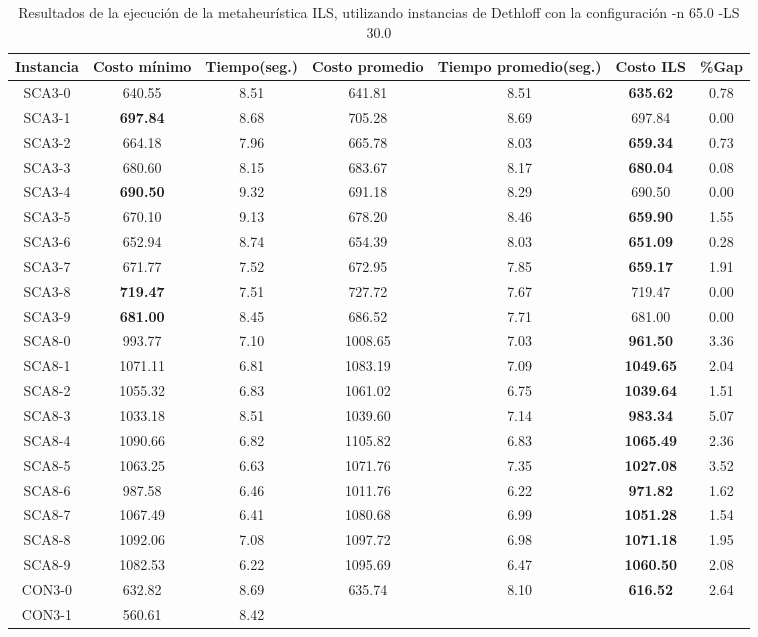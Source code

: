 \begin{table}[ht]
\caption{Resultados de la ejecución de la metaheurística ILS, utilizando instancias de Dethloff con la configuración -n 65.0 -LS 30.0}
\centering
\small
\begin{tabular}{c c c c c c c}
\hline\hline
Instancia & Costo mínimo & Tiempo(seg.) & Costo promedio & Tiempo promedio(seg.) & Costo ILS & \%Gap \\ [0.5ex]
\hline
SCA3-0 & 640.55 & 8.51 & 
641.81 & 8.51 & \bf{635.62} & 
0.78\\SCA3-1 & \bf{697.84} & 8.68 & 
705.28 & 8.69 & 697.84 & 0.00\\
SCA3-2 & 664.18 & 7.96 & 
665.78 & 8.03 & \bf{659.34} & 
0.73\\SCA3-3 & 680.60 & 8.15 & 
683.67 & 8.17 & \bf{680.04} & 
0.08\\SCA3-4 & \bf{690.50} & 9.32 & 
691.18 & 8.29 & 690.50 & 0.00\\
SCA3-5 & 670.10 & 9.13 & 
678.20 & 8.46 & \bf{659.90} & 
1.55\\SCA3-6 & 652.94 & 8.74 & 
654.39 & 8.03 & \bf{651.09} & 
0.28\\SCA3-7 & 671.77 & 7.52 & 
672.95 & 7.85 & \bf{659.17} & 
1.91\\SCA3-8 & \bf{719.47} & 7.51 & 
727.72 & 7.67 & 719.47 & 0.00\\
SCA3-9 & \bf{681.00} & 8.45 & 
686.52 & 7.71 & 681.00 & 0.00\\
SCA8-0 & 993.77 & 7.10 & 
1008.65 & 7.03 & \bf{961.50} & 
3.36\\SCA8-1 & 1071.11 & 6.81 & 
1083.19 & 7.09 & \bf{1049.65} & 
2.04\\SCA8-2 & 1055.32 & 6.83 & 
1061.02 & 6.75 & \bf{1039.64} & 
1.51\\SCA8-3 & 1033.18 & 8.51 & 
1039.60 & 7.14 & \bf{983.34} & 
5.07\\SCA8-4 & 1090.66 & 6.82 & 
1105.82 & 6.83 & \bf{1065.49} & 
2.36\\SCA8-5 & 1063.25 & 6.63 & 
1071.76 & 7.35 & \bf{1027.08} & 
3.52\\SCA8-6 & 987.58 & 6.46 & 
1011.76 & 6.22 & \bf{971.82} & 
1.62\\SCA8-7 & 1067.49 & 6.41 & 
1080.68 & 6.99 & \bf{1051.28} & 
1.54\\SCA8-8 & 1092.06 & 7.08 & 
1097.72 & 6.98 & \bf{1071.18} & 
1.95\\SCA8-9 & 1082.53 & 6.22 & 
1095.69 & 6.47 & \bf{1060.50} & 
2.08\\CON3-0 & 632.82 & 8.69 & 
635.74 & 8.10 & \bf{616.52} & 
2.64\\CON3-1 & 560.61 & 8.42 & 

\end{tabular}
\end{table}
